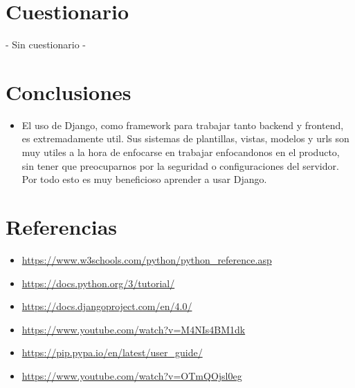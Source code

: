 \documentclass{article}
\begin{document}
    \section{Cuestionario}
	- Sin cuestionario -	
 \newpage
    \section{Conclusiones}
	\begin{itemize}
		\item El uso de Django, como framework para trabajar tanto backend y frontend, es extremadamente util. Sus sistemas de plantillas, vistas, modelos y urls son muy utiles a la hora de enfocarse en trabajar enfocandonos en el producto, sin tener que preocuparnos por la seguridad o configuraciones del servidor. Por todo esto es muy beneficioso aprender a usar Django. 
	\end{itemize}	
\clearpage

    
    \section{Referencias}
        \begin{itemize}	
            \item \url{https://www.w3schools.com/python/python_reference.asp}
            \item \url{ https://docs.python.org/3/tutorial/}
            \item \url{https://docs.djangoproject.com/en/4.0/}
            \item \url{https://www.youtube.com/watch?v=M4NIs4BM1dk}
            \item \url{https://pip.pypa.io/en/latest/user_guide/}
            \item \url{https://www.youtube.com/watch?v=OTmQOjsl0eg}
        \end{itemize}	
	
%
%
%
			
\end{document}
